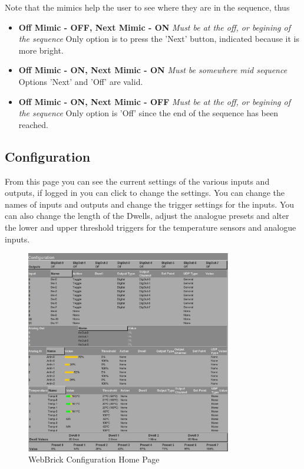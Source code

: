 Note that the mimics help the user to see where they are in the sequence, thus

	\begin{itemize}
		\item{\bf Off Mimic - OFF, Next Mimic - ON} {\em Must be at the off, or begining of the sequence } 
		Only option is to press the 'Next' button, indicated because it is more bright. 
		\item{\bf Off Mimic - ON, Next Mimic - ON} {\em Must be somewhere mid sequence }
		Options 'Next' and 'Off' are valid.
		\item{\bf Off Mimic - ON, Next Mimic - OFF} {\em Must be at the off, or begining of the sequence }
		Only option is 'Off' since the end of the sequence has been reached.
	\end{itemize}



\subsection{Configuration}
From this page you can see the current settings of the various inputs and outputs, 
if logged in you can click to change the settings. You can change the names of inputs and 
outputs and change the trigger settings for the inputs. You can also change the length of the 
Dwells, adjust the analogue presets and alter the lower and upper threshold triggers for the temperature
sensors and analogue inputs.

\begin{figure}[H]
\centering
\includegraphics[width=0.8\textwidth]{Images/configuration.jpg}
\caption{WebBrick Configuration Home Page}
\end{figure}

